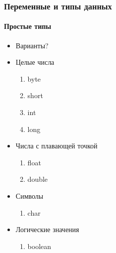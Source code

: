 \documentclass[10pt,pdf,hyperref={unicode}]{beamer}
\begin{document}
\begin{frame}
\frametitle{Переменные и типы данных}
\framesubtitle{Простые типы}
\begin{itemize}
  \item<1-> Варианты?
  \item<2-> Целые числа
  \begin{enumerate}
    \item byte
    \item short
    \item int
    \item long
  \end{enumerate}
  \item<3-> Числа с плавающей точкой
  \begin{enumerate}
    \item float
    \item double
  \end{enumerate}
  \item<4-> Символы
  \begin{enumerate}
    \item char
  \end{enumerate}
  \item<5-> Логические значения
  \begin{enumerate}
    \item boolean
  \end{enumerate}
\end{itemize}
\end{frame}
 
\end{document}
